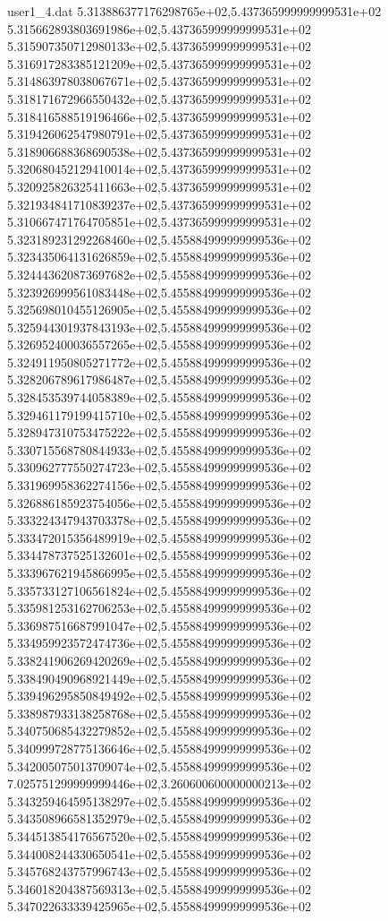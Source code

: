 \begin{filecontents}{user1_4.dat}
5.313886377176298765e+02,5.437365999999999531e+02
5.315662893803691986e+02,5.437365999999999531e+02
5.315907350712980133e+02,5.437365999999999531e+02
5.316917283385121209e+02,5.437365999999999531e+02
5.314863978038067671e+02,5.437365999999999531e+02
5.318171672966550432e+02,5.437365999999999531e+02
5.318416588519196466e+02,5.437365999999999531e+02
5.319426062547980791e+02,5.437365999999999531e+02
5.318906688368690538e+02,5.437365999999999531e+02
5.320680452129410014e+02,5.437365999999999531e+02
5.320925826325411663e+02,5.437365999999999531e+02
5.321934841710839237e+02,5.437365999999999531e+02
5.310667471764705851e+02,5.437365999999999531e+02
5.323189231292268460e+02,5.455884999999999536e+02
5.323435064131626859e+02,5.455884999999999536e+02
5.324443620873697682e+02,5.455884999999999536e+02
5.323926999561083448e+02,5.455884999999999536e+02
5.325698010455126905e+02,5.455884999999999536e+02
5.325944301937843193e+02,5.455884999999999536e+02
5.326952400036557265e+02,5.455884999999999536e+02
5.324911950805271772e+02,5.455884999999999536e+02
5.328206789617986487e+02,5.455884999999999536e+02
5.328453539744058389e+02,5.455884999999999536e+02
5.329461179199415710e+02,5.455884999999999536e+02
5.328947310753475222e+02,5.455884999999999536e+02
5.330715568780844933e+02,5.455884999999999536e+02
5.330962777550274723e+02,5.455884999999999536e+02
5.331969958362274156e+02,5.455884999999999536e+02
5.326886185923754056e+02,5.455884999999999536e+02
5.333224347943703378e+02,5.455884999999999536e+02
5.333472015356489919e+02,5.455884999999999536e+02
5.334478737525132601e+02,5.455884999999999536e+02
5.333967621945866995e+02,5.455884999999999536e+02
5.335733127106561824e+02,5.455884999999999536e+02
5.335981253162706253e+02,5.455884999999999536e+02
5.336987516687991047e+02,5.455884999999999536e+02
5.334959923572474736e+02,5.455884999999999536e+02
5.338241906269420269e+02,5.455884999999999536e+02
5.338490490968921449e+02,5.455884999999999536e+02
5.339496295850849492e+02,5.455884999999999536e+02
5.338987933138258768e+02,5.455884999999999536e+02
5.340750685432279852e+02,5.455884999999999536e+02
5.340999728775136646e+02,5.455884999999999536e+02
5.342005075013709074e+02,5.455884999999999536e+02
7.025751299999999446e+02,3.260600600000000213e+02
5.343259464595138297e+02,5.455884999999999536e+02
5.343508966581352979e+02,5.455884999999999536e+02
5.344513854176567520e+02,5.455884999999999536e+02
5.344008244330650541e+02,5.455884999999999536e+02
5.345768243757996743e+02,5.455884999999999536e+02
5.346018204387569313e+02,5.455884999999999536e+02
5.347022633339425965e+02,5.455884999999999536e+02

\end{filecontents}
